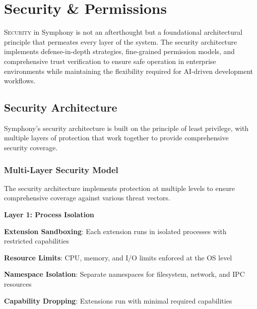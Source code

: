 
\section*{Security \& Permissions}

\lettrine{S}{ecurity} in Symphony is not an afterthought but a foundational architectural principle that permeates every layer of the system. The security architecture implements defense-in-depth strategies, fine-grained permission models, and comprehensive trust verification to ensure safe operation in enterprise environments while maintaining the flexibility required for AI-driven development workflows.

\subsection*{Security Architecture}

Symphony's security architecture is built on the principle of least privilege, with multiple layers of protection that work together to provide comprehensive security coverage.

\subsubsection*{Multi-Layer Security Model}

The security architecture implements protection at multiple levels to ensure comprehensive coverage against various threat vectors.

\textbf{Layer 1: Process Isolation}
\begin{compactlist}
    \item \textbf{Extension Sandboxing}: Each extension runs in isolated processes with restricted capabilities
    \item \textbf{Resource Limits}: CPU, memory, and I/O limits enforced at the OS level
    \item \textbf{Namespace Isolation}: Separate namespaces for filesystem, network, and IPC resources
    \item \textbf{Capability Dropping}: Extensions run with minimal required capabilities
\end{compactlist}

